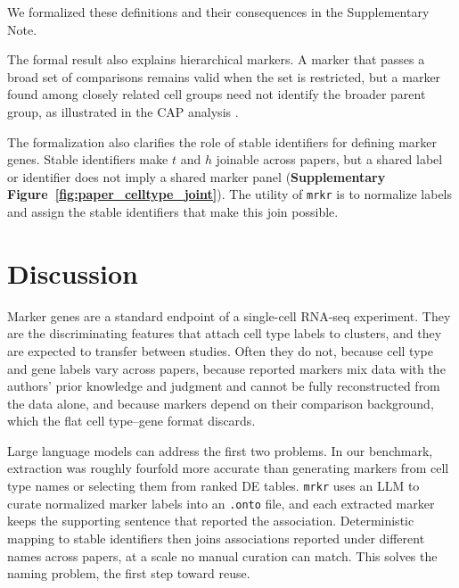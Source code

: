 \documentclass[10pt,twocolumn]{article}
\theoremstyle{plain}
\theoremstyle{definition}
\theoremstyle{remark}
\begin{document}
We formalized these definitions and their consequences in the Supplementary Note. 

 The formal result also explains hierarchical markers. A marker that passes a broad set of comparisons remains valid when the set is restricted, but a marker found among closely related cell groups need not identify the broader parent group, as illustrated in the CAP analysis \citep{Domcke2023ReferenceCellTree,Beltz2026ImmuneHierarchy}.

The formalization also clarifies the role of stable identifiers for defining marker genes. Stable identifiers make $t$ and $h$ joinable across papers, but a shared label or identifier does not imply a shared marker panel (\textbf{Supplementary Figure~\ref{fig:paper_celltype_joint}}). The utility of \texttt{mrkr} is to normalize labels and assign the stable identifiers that make this join possible.

\section{Discussion}

Marker genes are a standard endpoint of a single-cell RNA-seq experiment. They are the discriminating features that attach cell type labels to clusters, and they are expected to transfer between studies. Often they do not, because cell type and gene labels vary across papers, because reported markers mix data with the authors' prior knowledge and judgment and cannot be fully reconstructed from the data alone, and because markers depend on their comparison background, which the flat cell type--gene format discards.

Large language models can address the first two problems. In our benchmark, extraction was roughly fourfold more accurate than generating markers from cell type names or selecting them from ranked DE tables. \texttt{mrkr} uses an LLM to curate normalized marker labels into an \texttt{.onto} file, and each extracted marker keeps the supporting sentence that reported the association. Deterministic mapping to stable identifiers then joins associations reported under different names across papers, at a scale no manual curation can match. This solves the naming problem, the first step toward reuse. 
\end{document}
